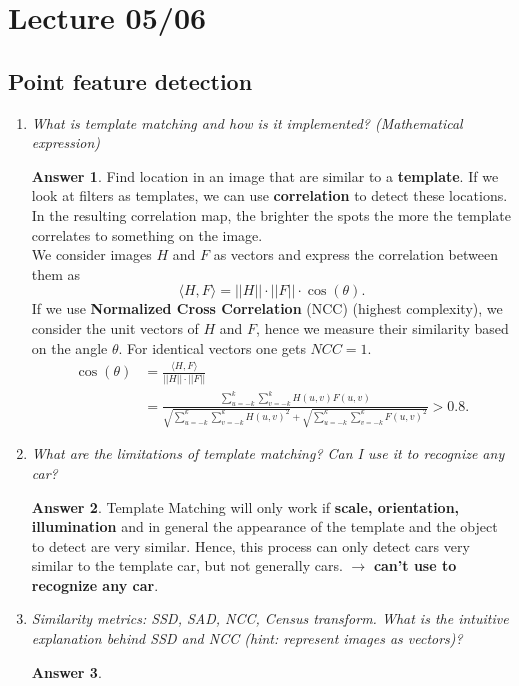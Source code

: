 \documentclass[a4paper,12 pt]{article}
\theoremstyle{definition}
\theoremstyle{remark}
\theoremstyle{definition}
\theoremstyle{definition}
\theoremstyle{definition}
\theoremstyle{definition}
\theoremstyle{remark}
\theoremstyle{remark}
\theoremstyle{definition}
\theoremstyle{definition}
\newtheorem*{answer}{Answer}
\begin{document}
\section*{Lecture 05/06}
\subsection*{Point feature detection}
\begin{enumerate}
\item \textit{What is template matching and how is it implemented? (Mathematical expression)}
\begin{answer}
Find location in an image that are similar to a \textbf{template}. If we look at filters as templates, we can use \textbf{correlation} to detect these locations. In the resulting correlation map, the brighter the spots the more the template correlates to something on the image.\\
We consider images $H$ and $F$ as vectors and express the correlation between them as
\begin{equation}
\langle H,F\rangle=||H|| \cdot ||F|| \cdot \cos(\theta).
\end{equation}
If we use \textbf{Normalized Cross Correlation} (NCC) (highest complexity), we consider the unit vectors of $H$ and $F$, hence we measure their similarity based on the angle $\theta$. For identical vectors one gets $NCC=1$. 
\begin{equation}
\begin{split}
\cos(\theta)&=\frac{\langle H,F \rangle}{||H||\cdot ||F||}\\
&=\frac{\sum_{u=-k}^{k}\sum_{v=-k}^{k}H(u,v)F(u,v)}{\sqrt{\sum_{u=-k}^{k}\sum_{v=-k}^{k}H(u,v)^2}+\sqrt{\sum_{u=-k}^{k}\sum_{v=-k}^{k}F(u,v)^2}}>0.8.
\end{split}
\end{equation}
\end{answer}
\item \textit{What are the limitations of template matching? Can I use it to recognize any car?}
\begin{answer}
Template Matching will only work if \textbf{scale, orientation, illumination} and in general the appearance of the template and the object to detect are very similar. Hence, this process can only detect cars very similar to the template car, but not generally cars. $\rightarrow$ \textbf{can't use to recognize any car}.
\end{answer}
\item \textit{Similarity metrics: SSD, SAD, NCC, Census transform. What is the intuitive explanation behind SSD and NCC (hint: represent images as vectors)?}
\begin{answer}


\end{answer}
\end{enumerate}
\end{document}
